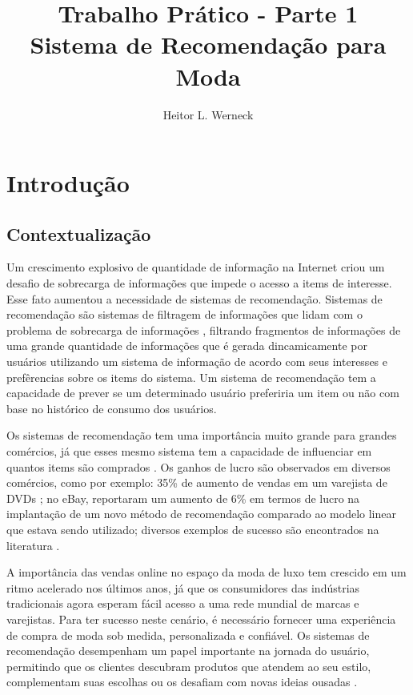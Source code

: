 \documentclass{article}
\title{Trabalho Prático - Parte 1 \\
\large Sistema de Recomendação para Moda}
\author{Heitor L. Werneck}
\begin{document}
\maketitle

\section{Introdução}
\subsection{Contextualização}
Um crescimento explosivo de quantidade de informação na Internet criou um desafio de sobrecarga de informações que impede o acesso a items de interesse. Esse fato aumentou a necessidade de sistemas de recomendação. Sistemas de recomendação são sistemas de filtragem de informações que lidam com o problema de sobrecarga de informações \cite{konstan2012recommender}, filtrando fragmentos de informações de uma grande quantidade de informações que é gerada dincamicamente por usuários utilizando um sistema de informação de acordo com seus interesses e prefêrencias sobre os items do sistema. Um sistema de recomendação tem a capacidade de prever se um determinado usuário preferiria um item ou não com base no histórico de consumo dos usuários.

Os sistemas de recomendação tem uma importância muito grande para grandes comércios, já que esses mesmo sistema tem a capacidade de influenciar em quantos items são comprados \cite{jannach2019measuring}. Os ganhos de lucro são observados em diversos comércios, como por exemplo: 35\% de aumento de vendas em um varejista de DVDs \cite{lee2014impact}; no eBay, \citeauthor{brovman2016optimizing} reportaram um aumento de 6\% em termos de lucro na implantação de um novo método de recomendação comparado ao modelo linear que estava sendo utilizado; diversos exemplos de sucesso são encontrados na literatura \cite{jannach2019measuring}.

A importância das vendas online no espaço da moda de luxo tem crescido em um ritmo acelerado nos últimos anos, já que os consumidores das indústrias tradicionais agora esperam fácil acesso a uma rede mundial de marcas e varejistas. Para ter sucesso neste cenário, é necessário fornecer uma experiência de compra de moda sob medida, personalizada e confiável. Os sistemas de recomendação desempenham um papel importante na jornada do usuário, permitindo que os clientes descubram produtos que atendem ao seu estilo, complementam suas escolhas ou os desafiam com novas ideias ousadas \cite{farfetchfashionrecommendationschallenge2021}.
\end{document}
